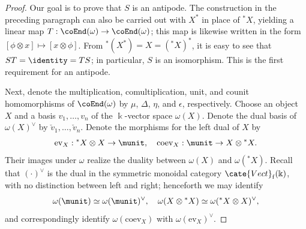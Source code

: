 \begin{proof}
	Our goal is to prove that $S$ is an antipode. The construction in the
	preceding paragraph can also be carried out with $X^*$ in place of
	${}^* X$, yielding a linear map
	$T: \coEnd(\omega) \to \coEnd(\omega)$; this map is likewise written in
	the form $[\phi \otimes x] \mapsto [x \otimes \phi]$. From
	${}^* (X^*) = X = ({}^* X)^*$, it is easy to see that
	$ST = \identity = TS$; in particular, $S$ is an isomorphism. This is the
	first requirement for an antipode.
	
	Next, denote the multiplication, comultiplication, unit, and counit
	homomorphisms of $\coEnd(\omega)$ by $\mu$, $\Delta$, $\eta$, and
	$\epsilon$, respectively. Choose an object $X$ and a basis
	$v_1, \ldots, v_n$ of the $\Bbbk$-vector space $\omega(X)$. Denote the
	dual basis of $\omega(X)^\vee$ by
	$\check{v}_1, \ldots, \check{v}_n$. Denote the morphisms for the left
	dual of $X$ by
	\[ \mathrm{ev}_X: {}^* X \otimes X \to \munit, \quad \mathrm{coev}_X: \munit \to X \otimes {}^* X. \]
	Their images under $\omega$ realize the duality between $\omega(X)$ and
	$\omega({}^* X)$. Recall that $(\cdot)^\vee$ is the dual in the symmetric
	monoidal category $\cate{Vect}_{\mathrm{f}}(\Bbbk)$, with no distinction
	between left and right; henceforth we may identify
	\begin{equation*}
		\omega(\munit) \simeq \omega(\munit)^\vee, \quad \omega(X \otimes {}^* X) \simeq \omega({}^* X \otimes X)^\vee,
	\end{equation*}
	and correspondingly identify $\omega(\mathrm{coev}_X)$ with
	$\omega(\mathrm{ev}_X)^\vee$.
	

\end{proof}
